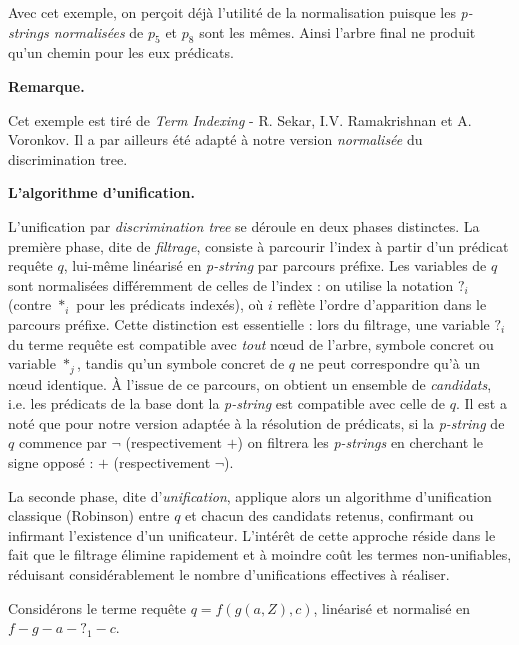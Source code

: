 \documentclass[11pt]{article}
\newenvironment{remarque}{%
    \begin{mdframed}[
        linecolor=sectioncolor!40,
        linewidth=0.8pt,
        backgroundcolor=sectioncolor!5,
        innerleftmargin=10pt,
        innerrightmargin=10pt,
        innertopmargin=6pt,
        innerbottommargin=6pt,
        skipabove=8pt,
        skipbelow=8pt
    ]
    \noindent\textbf{\small\color{sectioncolor}Remarque.}\enspace\small\itshape
}{%
    \end{mdframed}
}
\begin{document}
Avec cet exemple, on perçoit déjà l'utilité de la normalisation puisque les \textit{p-strings normalisées} de $p_5$ et $p_8$ sont les mêmes. Ainsi l'arbre final ne produit qu'un chemin pour les eux prédicats.

\begin{remarque}
    Cet exemple est tiré de \emph{Term Indexing} - R. Sekar, I.V. Ramakrishnan et A. Voronkov. Il a par ailleurs été adapté à notre version \emph{normalisée} du discrimination tree.
\end{remarque}

\newpage

\vspace{0.4cm}
\noindent\textbf{L'algorithme d'unification.}
\vspace{0.4cm}

L'unification par \textit{discrimination tree} se déroule en deux phases distinctes. 
La première phase, dite de \textit{filtrage}, consiste à parcourir l'index à partir 
d'un prédicat requête $q$, lui-même linéarisé en \textit{p-string} par parcours préfixe. 
Les variables de $q$ sont normalisées différemment de celles de l'index : on utilise la 
notation $?_i$ (contre $*_i$ pour les prédicats indexés), où $i$ reflète l'ordre 
d'apparition dans le parcours préfixe. Cette distinction est essentielle : lors du 
filtrage, une variable $?_i$ du terme requête est compatible avec \textit{tout} nœud de 
l'arbre, symbole concret ou variable $*_j$, tandis qu'un symbole concret de $q$ ne 
peut correspondre qu'à un nœud identique. À l'issue de ce parcours, on obtient un ensemble de \textit{candidats}, i.e. les prédicats de la base dont la \textit{p-string} est compatible avec celle de $q$. Il est a noté que pour notre version adaptée à la résolution de prédicats, si la \textit{p-string} de $q$ commence par $\neg$ (respectivement $+$) on filtrera les \textit{p-strings} en cherchant le signe opposé : $+$ (respectivement $\neg$).

\vspace{0.2cm}
La seconde phase, dite d'\textit{unification}, applique 
alors un algorithme d'unification classique (Robinson) entre $q$ et chacun des candidats retenus, 
confirmant ou infirmant l'existence d'un unificateur. L'intérêt de cette approche réside 
dans le fait que le filtrage élimine rapidement et à moindre coût les termes 
non-unifiables, réduisant considérablement le nombre d'unifications effectives à réaliser.

\vspace{0.2cm}
Considérons le terme requête $q = f(g(a, Z), c)$, linéarisé et normalisé en 
$f-g-a-{?_1}-c$.
\end{document}

